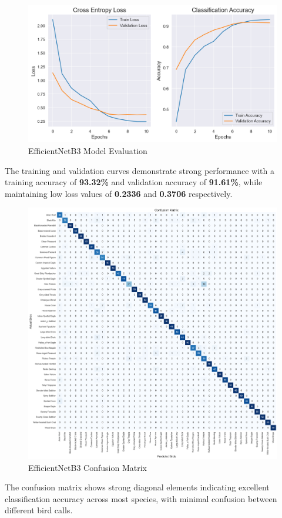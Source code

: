 \begin{figure}[h!]
            \centering
            \includegraphics[scale=0.6]{images/efficientNet_evaluation.png}
            \caption{EfficientNetB3 Model Evaluation}
      \end{figure}
The training and validation curves demonstrate strong performance with a training accuracy of \textbf{93.32\%} and validation accuracy of \textbf{91.61\%}, while maintaining low loss values of \textbf{0.2336} and \textbf{0.3706} respectively.
\newpage
\begin{figure}[h!]
            \centering
            \includegraphics[scale=0.35]{images/efficientNet_confusion_matix.png}
            \caption{EfficientNetB3 Confusion Matrix}
      \end{figure}
      The confusion matrix shows strong diagonal elements indicating excellent classification accuracy across most species, with minimal confusion between different bird calls.
\newpage

